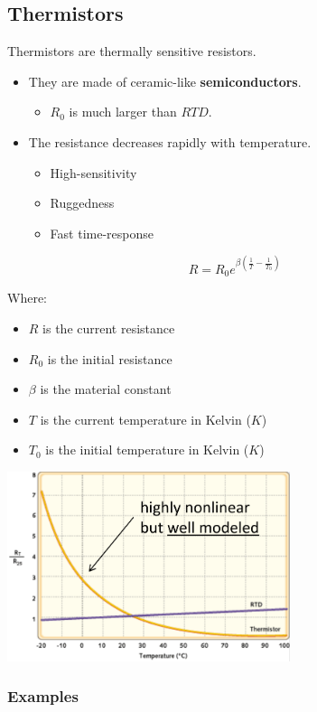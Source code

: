 \documentclass[11pt]{article}
\begin{document}
 \newpage
\subsection{Thermistors}
\label{sec:orgb0ccb86}
Thermistors are thermally sensitive resistors.
\begin{itemize}
\item They are made of ceramic-like \textbf{semiconductors}.
\begin{itemize}
\item \(R_0\) is much larger than \(RTD\).
\end{itemize}
\item The resistance decreases rapidly with temperature.
\begin{itemize}
\item High-sensitivity
\item Ruggedness
\item Fast time-response
\end{itemize}
\end{itemize}

\[R = R_0 e^{\beta \left(\frac{1}{T} - \frac{1}{T_0} \right)}\]

Where:
\begin{itemize}
\item \(R\) is the current resistance
\item \(R_0\) is the initial resistance
\item \(\beta\) is the material constant
\item \(T\) is the current temperature in Kelvin (\(\unit{K}\))
\item \(T_0\) is the initial temperature in Kelvin (\(\unit{K}\))
\end{itemize}

\begin{center}
\includegraphics[height=15em]{./images/thermistor-resistance-response-graph.png}
\end{center}
\subsubsection{Examples}
\label{sec:org3b785d4}
\end{document}
